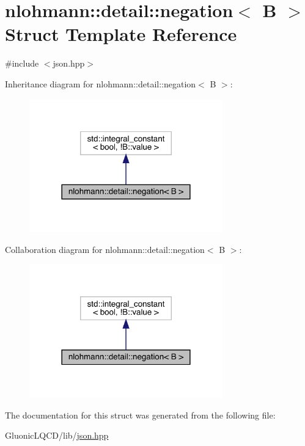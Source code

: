 \hypertarget{structnlohmann_1_1detail_1_1negation}{}\section{nlohmann\+::detail\+::negation$<$ B $>$ Struct Template Reference}
\label{structnlohmann_1_1detail_1_1negation}


{\ttfamily \#include $<$json.\+hpp$>$}



Inheritance diagram for nlohmann\+::detail\+::negation$<$ B $>$\+:
\nopagebreak
\begin{figure}[H]
\begin{center}
\leavevmode
\includegraphics[width=237pt]{structnlohmann_1_1detail_1_1negation__inherit__graph}
\end{center}
\end{figure}


Collaboration diagram for nlohmann\+::detail\+::negation$<$ B $>$\+:
\nopagebreak
\begin{figure}[H]
\begin{center}
\leavevmode
\includegraphics[width=237pt]{structnlohmann_1_1detail_1_1negation__coll__graph}
\end{center}
\end{figure}


The documentation for this struct was generated from the following file\+:\begin{DoxyCompactItemize}
\item 
Gluonic\+L\+Q\+C\+D/lib/\mbox{\hyperlink{json_8hpp}{json.\+hpp}}\end{DoxyCompactItemize}
